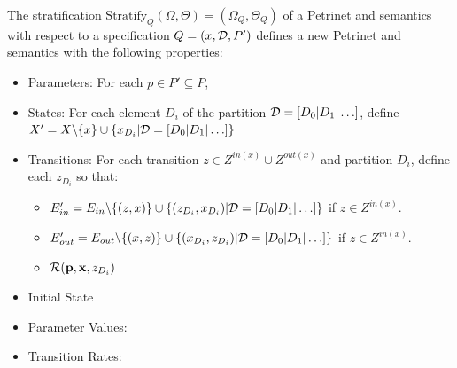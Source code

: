\begin{definition}
	The stratification $\text{Stratify}_{Q}(\Omega,
		\Theta) = (\Omega_Q, \Theta_Q)$ of a Petrinet and semantics  with
	respect to a specification $Q = (x, {\cal D}, P')$ defines a new Petrinet and
	semantics with the following properties:
	\begin{itemize}
		\item Parameters: For each $p \in P' \subseteq P$,
		\item States: For each element $D_i$ of the partition ${\cal D}= [D_0 | D_1| \ldots]$, define
		      $X' = X\backslash \{x\} \cup \{x_{D_i} |  {\cal D} = [D_0 | D_1| \ldots]\}$
		\item Transitions: For each transition $z \in Z^{in(x)}\cup Z^{out(x)}$
		      and partition $D_i$, define each $z_{D_i}$ so that:
		      \begin{itemize}
			      \item $E'_{in} = E_{in} \backslash \{(z, x)\} \cup \{(z_{D_i},
				            x_{D_i})| {\cal D} = [D_0 | D_1| \ldots]\}$ if $z \in
				            Z^{in(x)}$.
			      \item $E'_{out} = E_{out} \backslash \{(x, z)\} \cup \{(x_{D_i},
				            z_{D_i})| {\cal D} = [D_0 | D_1| \ldots]\}$ if $z \in
				            Z^{in(x)}$.
			      \item ${\cal R}({\bf p},{\bf x}, z_{D_i})$
		      \end{itemize}
		\item Initial State
		\item Parameter Values:
		\item Transition Rates:
	\end{itemize}
\end{definition}
